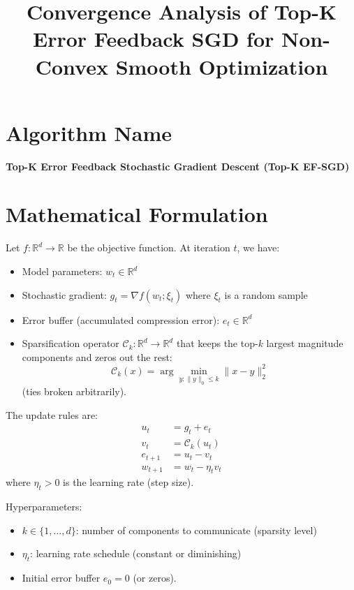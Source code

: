 \documentclass{article}
\title{Convergence Analysis of Top-K Error Feedback SGD for Non-Convex Smooth Optimization}
\author{}
\date{}
\begin{document}
\maketitle

\section*{Algorithm Name}
\textbf{Top-K Error Feedback Stochastic Gradient Descent (Top-K EF-SGD)}

\section*{Mathematical Formulation}
Let $f: \mathbb{R}^d \to \mathbb{R}$ be the objective function. At iteration $t$, we have:
\begin{itemize}
    \item Model parameters: $w_t \in \mathbb{R}^d$
    \item Stochastic gradient: $g_t = \nabla f(w_t; \xi_t)$ where $\xi_t$ is a random sample
    \item Error buffer (accumulated compression error): $e_t \in \mathbb{R}^d$
    \item Sparsification operator $\mathcal{C}_k: \mathbb{R}^d \to \mathbb{R}^d$ that keeps the top-$k$ largest magnitude components and zeros out the rest:
    \[
    \mathcal{C}_k(x) = \arg\min_{y: \|y\|_0 \le k} \|x - y\|_2^2
    \]
    (ties broken arbitrarily).
\end{itemize}
The update rules are:
\begin{align}
    u_t &= g_t + e_t \label{eq:ut} \\
    v_t &= \mathcal{C}_k(u_t) \label{eq:vt} \\
    e_{t+1} &= u_t - v_t \label{eq:et} \\
    w_{t+1} &= w_t - \eta_t v_t \label{eq:wt}
\end{align}
where $\eta_t > 0$ is the learning rate (step size).

Hyperparameters:
\begin{itemize}
    \item $k \in \{1, \dots, d\}$: number of components to communicate (sparsity level)
    \item $\eta_t$: learning rate schedule (constant or diminishing)
    \item Initial error buffer $e_0 = 0$ (or zeros).
\end{itemize}
\end{document}
